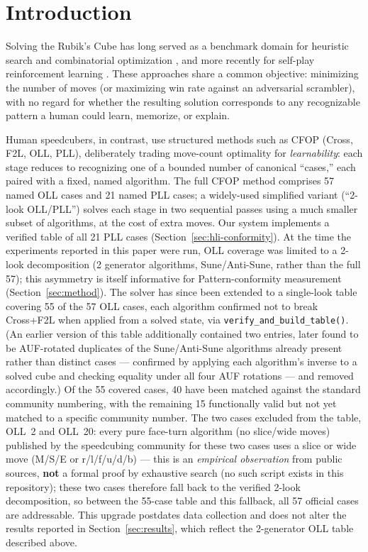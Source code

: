 \documentclass[10pt,conference]{article}
\begin{document}
\section{Introduction}
\label{sec:intro}

Solving the Rubik's Cube has long served as a benchmark domain for
heuristic search and combinatorial optimization
\citep{korf1997,rokicki2014}, and more recently for
self-play reinforcement learning \citep{mcaleer2018}. These
approaches share a common objective: minimizing the number of moves
(or maximizing win rate against an adversarial scrambler), with no
regard for whether the resulting solution corresponds to any
recognizable pattern a human could learn, memorize, or explain.

Human speedcubers, in contrast, use structured methods such as CFOP
(Cross, F2L, OLL, PLL), deliberately trading move-count optimality
for \emph{learnability}: each stage reduces to recognizing one of a
bounded number of canonical ``cases,'' each paired with a fixed,
named algorithm. The full CFOP method comprises 57 named OLL cases
and 21 named PLL cases; a widely-used simplified variant
(``2-look OLL/PLL'') solves each stage in two sequential passes using
a much smaller subset of algorithms, at the cost of extra moves. Our
system implements a verified table of all 21 PLL cases
(Section~\ref{sec:hli-conformity}). At the time the experiments
reported in this paper were run, OLL coverage was limited to a
2-look decomposition (2 generator algorithms, Sune/Anti-Sune, rather
than the full 57); this asymmetry is itself informative for
Pattern-conformity measurement (Section~\ref{sec:method}). The
solver has since been extended to a single-look table covering 55 of
the 57 OLL cases, each algorithm confirmed not to break Cross+F2L
when applied from a solved state, via
\texttt{verify\_and\_build\_table()}. (An earlier version of this
table additionally contained two entries, later found to be
AUF-rotated duplicates of the Sune/Anti-Sune algorithms already
present rather than distinct cases --- confirmed by applying each
algorithm's inverse to a solved cube and checking equality under all
four AUF rotations --- and removed accordingly.) Of the 55 covered
cases, 40 have been matched against the standard community
numbering, with the remaining 15 functionally valid but not yet
matched to a specific community number. The two cases excluded from
the table, OLL~2 and OLL~20: every pure face-turn algorithm (no
slice/wide moves) published by the speedcubing community for these
two cases uses a slice or wide move (M/S/E or r/l/f/u/d/b) --- this
is an \emph{empirical observation} from public sources, \textbf{not}
a formal proof by exhaustive search (no such script exists in this
repository); these two cases therefore fall back to the verified
2-look decomposition, so between the 55-case table and this
fallback, all 57 official cases are addressable. This upgrade
postdates data collection and does not alter the results reported in
Section~\ref{sec:results}, which reflect the 2-generator OLL table
described above.
\end{document}
